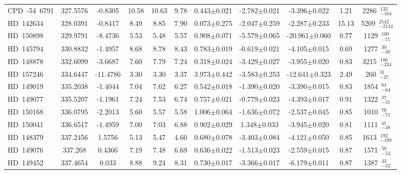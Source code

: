 {\begin{longtable}{lcccccccccc}
\noalign{\smallskip}
CPD~-54~6791 & 327.5576 & -0.8305 & 10.58 & 10.63 & 9.78 & 0.443$\pm$0.021 & -2.782$\pm$0.021 & -3.396$\pm$0.022 & 1.21 & 2286~$_{-104}^{133}$ \\
\noalign{\smallskip}
HD~142634 & 328.0391 & -0.8417 & 8.49 & 8.85 & 7.90 & 0.073$\pm$0.275 & -2.047$\pm$0.259 & -2.287$\pm$0.233 & 15.13 & 5209~$_{-2134}^{2542}$ \\
\noalign{\smallskip}
HD~150898 & 329.9791 & -8.4736 & 5.53 & 5.48 & 5.57 & 0.908$\pm$0.071 & -5.579$\pm$0.065 & -20.961$\pm$0.060 & 0.77 & 1129~$_{-75}^{100}$ \\
\noalign{\smallskip}
HD~145794 & 330.8832 & -1.4957 & 8.68 & 8.78 & 8.43 & 0.783$\pm$0.019 & -0.619$\pm$0.021 & -4.105$\pm$0.015 & 0.69 & 1277~$_{-30}^{30}$ \\
\noalign{\smallskip}
HD~148878 & 332.6099 & -3.6687 & 7.60 & 7.79 & 7.24 & 0.318$\pm$0.024 & -3.429$\pm$0.027 & -3.955$\pm$0.020 & 0.83 & 3215~$_{-234}^{186}$ \\
\noalign{\smallskip}
HD~157246 & 334.6447 & -11.4786 & 3.30 & 3.30 & 3.37 & 3.973$\pm$0.442 & -3.583$\pm$0.253 & -12.641$\pm$0.323 & 2.49 & 260~$_{-27}^{31}$ \\
\noalign{\smallskip}
HD~149019 & 335.2038 & -1.4044 & 7.04 & 7.62 & 6.27 & 0.542$\pm$0.018 & -1.390$\pm$0.020 & -3.390$\pm$0.015 & 0.83 & 1854~$_{-64}^{64}$ \\
\noalign{\smallskip}
HD~149077 & 335.5207 & -1.1961 & 7.24 & 7.53 & 6.74 & 0.757$\pm$0.021 & -0.779$\pm$0.023 & -4.393$\pm$0.017 & 0.91 & 1322~$_{-31}^{37}$ \\
\noalign{\smallskip}
HD~150168 & 336.0795 & -2.2013 & 5.60 & 5.57 & 5.58 & 1.006$\pm$0.064 & -1.636$\pm$0.072 & -2.537$\pm$0.045 & 0.85 & 1010~$_{-71}^{79}$ \\
\noalign{\smallskip}
HD~150041 & 336.6517 & -1.4959 & 7.00 & 7.03 & 6.88 & 0.902$\pm$0.029 & 1.348$\pm$0.033 & -3.945$\pm$0.020 & 0.81 & 1111~$_{-38}^{41}$ \\
\noalign{\smallskip}
HD~148379 & 337.2456 & 1.5756 & 5.13 & 5.47 & 4.60 & 0.680$\pm$0.078 & -3.403$\pm$0.084 & -4.121$\pm$0.050 & 0.85 & 1613~$_{-199}^{192}$ \\
\noalign{\smallskip}
HD~149076 & 337.268 & 0.4366 & 7.19 & 7.48 & 6.69 & 0.636$\pm$0.022 & -1.513$\pm$0.023 & -2.559$\pm$0.015 & 0.87 & 1571~$_{-53}^{50}$ \\
\noalign{\smallskip}
HD~149452 & 337.4654 & 0.033 & 8.88 & 9.24 & 8.31 & 0.730$\pm$0.017 & -3.366$\pm$0.017 & -6.179$\pm$0.011 & 0.87 & 1387~$_{-32}^{33}$ \\

\end{longtable}}
